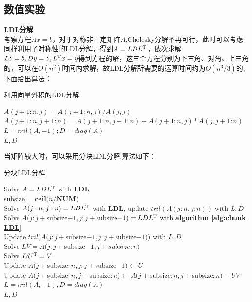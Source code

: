 \documentclass[12pt]{ctexart}
\begin{document}
\subsection{数值实验}
\noindent \textbf{LDL分解}\\
考察方程$Ax=b$，对于对称非正定矩阵$A$,Cholesky分解不再可行，此时可以考虑同样利用了对称性的LDL分解，得到$A=LDL^{\rm T}$，依次求解$Lz=b,Dy=z,L^{\rm T} x=y$得到方程的解，这三个方程分别为下三角、对角、上三角的，可以在$O(n^2)$时间内求解，故LDL分解所需要的运算时间约为$O(n^3/3)$的,下面给出算法：\\
\begin{algorithm}[H]
	\caption{利用向量外积的LDL分解}  
	\label{alg:gaxpy ldl}
	{ 
		$A(j+1:n,j) = A(j+1:n,j)/A(j,j)$\\
		$A(j+1:n,j+1:n) = A(j+1:n,j+1:n)-A(j+1:n,j)*A(j,j+1:n)$\\	
	}  
	$L = tril(A,-1); D = diag(A)$\\
	\Return $L,D$\;
\end{algorithm}
当矩阵较大时，可以采用分块LDL分解,算法如下：\\
\begin{algorithm}[H]
	\caption{分块LDL分解}  
	\label{alg:chunk LDL}
	{
			Solve $A=LDL^{\rm T}$ with  \textbf{LDL}\\
	}  
	subsize = $\textbf{ceil}(n/\textbf{NUM}$)\\
	{ 
		{
			Solve $ A(j:n,j:n) = LDL^{\rm T} $ with \textbf{LDL}, update $ tril(A(j:n,j:n))$ with $ L,D$\\
		}
		\Else
		{
			Solve $A(j:j+$subsize$-1,j:j+$subsize$-1) = LDL^{\rm T}$ with \textbf{algorithm \ref{alg:chunk LDL}}\\
			Update $tril(A(j:j+$subsize$-1,j:j+$subsize$-1)) $ with $ L,D$\\
			Solve $ LV= A(j:j+$subsize$-1,j+subsize:n) $\\
			Solve $ DU^{\rm T} = V $\\
			Update $A(j+$subsize$:n,j:j+$subsize$-1)\gets U $\\
			Update $A(j+$subsize$:n,j+$subsize$:n)\gets A(j+$subsize$:n,j+$subsize$:n)-UV$\\						
		}	
	} 
 	$L = tril(A,-1),D=diag(A)$\\
	\Return $L,D$\;
\end{algorithm}
\end{document}
